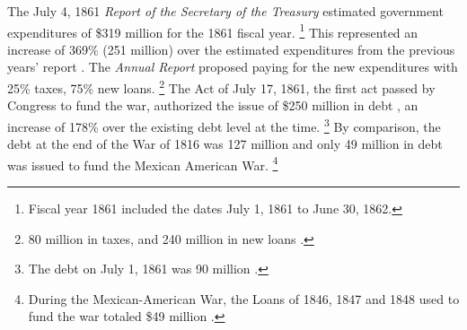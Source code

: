\documentclass[]{article}\usepackage[]{graphicx}\usepackage[]{color}
\begin{document}
The July 4, 1861 \textit{Report of the Secretary of the Treasury} estimated government expenditures of \$319 million for the 1861 fiscal year\parencite[5]{Treasury1861a}.%
\footnote{Fiscal year 1861 included the dates July 1, 1861 to June 30, 1862.} 
This represented an increase of 369\% (251 million) over the estimated expenditures from the previous years' report \parencite[6]{Treasury1860}.
The \textit{Annual Report} proposed paying for the new expenditures with 25\% taxes, 75\% new loans.%
\footnote{80 million in taxes, and 240 million in new loans \parencite[6]{Treasury1861a}.}
The Act of July 17, 1861, the first act passed by Congress to fund the war, authorized the issue of \$250 million in debt \parencite[44]{Treasury1863}, an increase of 178\% over the existing debt level at the time.%
\footnote{The debt on July 1, 1861 was 90 million \parencite[23]{Treasury1861a}.}
By comparison, the debt at the end of the War of 1816 was 127 million \parencite[29]{Elder1863} and only 49 million in debt was issued to fund the Mexican American War.%
\footnote{During the Mexican-American War, the Loans of 1846, 1847 and 1848 used to fund the war totaled \$49 million \parencite[42]{Treasury1863}.}
\end{document}
